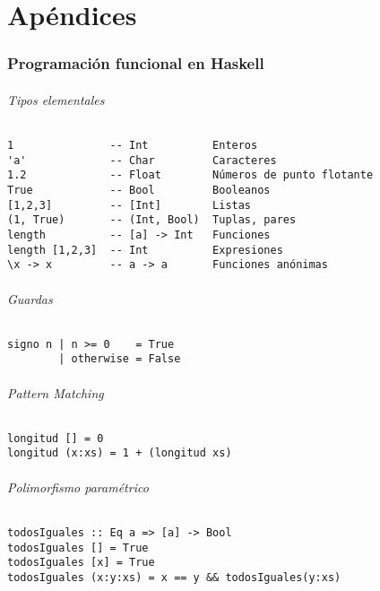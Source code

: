 \part{Apéndices}

\section{Programación funcional en Haskell}
\paragraph{Tipos elementales}
\begin{centrado}
	\begin{verbatim}
1               -- Int          Enteros
'a'             -- Char         Caracteres
1.2             -- Float        Números de punto flotante
True            -- Bool         Booleanos
[1,2,3]         -- [Int]        Listas
(1, True)       -- (Int, Bool)  Tuplas, pares
length          -- [a] -> Int   Funciones
length [1,2,3]  -- Int          Expresiones
\x -> x         -- a -> a       Funciones anónimas
	\end{verbatim}
\end{centrado}

\paragraph{Guardas}
\begin{centrado}
	\begin{verbatim}
signo n | n >= 0    = True
		| otherwise = False
	\end{verbatim}
\end{centrado}

\paragraph{Pattern Matching}
\begin{centrado}
	\begin{verbatim}
longitud [] = 0
longitud (x:xs) = 1 + (longitud xs)
	\end{verbatim}
\end{centrado}

\paragraph{Polimorfismo paramétrico}
\begin{centrado}
	\begin{verbatim}
todosIguales :: Eq a => [a] -> Bool
todosIguales [] = True
todosIguales [x] = True
todosIguales (x:y:xs) = x == y && todosIguales(y:xs)
	\end{verbatim}
\end{centrado}

